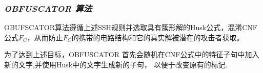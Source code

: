 %
%
%

\subsubsection{\textsl{OBFUSCATOR 算法}}

%
OBUFSCATOR算法遵循上述SSH规则并选取具有簇形解的Husk公式，混淆CNF公式$F_C$，从而防止$F_C$的携带的电路结构和它的真实解被潜在的攻击者获取。

为了达到上述目标，OBFUSCATOR 首先会随机在CNF公式中的特征子句中加入新的文字,并使用Husk中的文字生成新的子句，
以便于改变原有的标记.

